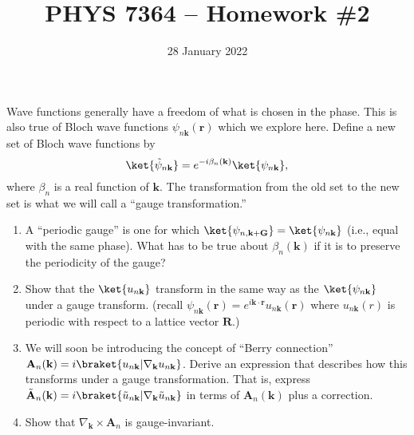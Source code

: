 \documentclass{jhwhw}
\author{}
\title{PHYS 7364 -- Homework \#2}
\date{28 January 2022}
\begin{document}

Wave functions generally have a freedom of what is chosen in the phase.
This is also true of Bloch wave functions $\psi_{n\mathbf k}(\mathbf r)$ which we explore here.
Define a new set of Bloch wave functions by
\begin{equation}
  \label{eq:1}
  \ket{\tilde \psi_{n\mathbf k}} = e^{-i\beta_{n}(\mathbf k)}\ket{\psi_{n\mathbf k}},
\end{equation}
where $\beta_{n}$ is a real function of $\mathbf k$. The transformation from the old set to the new set is what we will call a ``gauge transformation.''
\begin{enumerate}
  \item A ``periodic gauge'' is one for which $\ket{\psi_{n,\mathbf k+ \mathbf G}} = \ket{\psi_{n\mathbf k}}$ (i.e., equal with the same phase). What has to be true about $\beta_{n}(\mathbf k)$ if it is to preserve the periodicity of the gauge?
  \item Show that the $\ket{u_{n\mathbf k}}$ transform in the same way as the $\ket{\psi_{n\mathbf k}}$ under a gauge transform. (recall $\psi_{n\mathbf k}(\mathbf r) = e^{i \mathbf k\cdot \mathbf r} u_{n\mathbf k}(\mathbf r)$ where $u_{n\mathbf k}(r)$ is periodic with respect to a lattice vector $\mathbf R$.)
  \item We will soon be introducing the concept of ``Berry connection'' $\mathbf A_{n}(\mathbf k) = i \braket{u_{n\mathbf k} | \nabla_{\mathbf k} u_{n\mathbf k}}$. Derive an expression that describes how this transforms under a gauge transformation. That is, express $\tilde{\mathbf A}_{n}(\mathbf k) = i \braket{\tilde u_{n\mathbf k} | \nabla_{\mathbf k} \tilde u_{n\mathbf k}}$ in terms of $\mathbf A_{n}(\mathbf k)$ plus a correction.
  \item Show that $\nabla_{\mathbf k} \times \mathbf A_{n}$ is gauge-invariant.
\end{enumerate}

\end{document}
